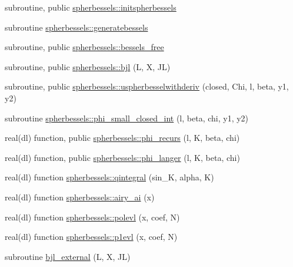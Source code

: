 \begin{DoxyCompactItemize}
\item 
subroutine, public \mbox{\hyperlink{namespacespherbessels_ab479fd257b8fa714e8a3522ab65e11af}{spherbessels\+::initspherbessels}}
\item 
subroutine \mbox{\hyperlink{namespacespherbessels_a94dad04f4df289878f0e038437916427}{spherbessels\+::generatebessels}}
\item 
subroutine, public \mbox{\hyperlink{namespacespherbessels_a0abb3ebb234b8547151b14c0cdb439be}{spherbessels\+::bessels\+\_\+free}}
\item 
subroutine, public \mbox{\hyperlink{namespacespherbessels_a1619c25c91b245252b30a3da4d640050}{spherbessels\+::bjl}} (L, X, JL)
\item 
subroutine, public \mbox{\hyperlink{namespacespherbessels_a19f6db59afef649058999b63f9ab8f65}{spherbessels\+::uspherbesselwithderiv}} (closed, Chi, l, beta, y1, y2)
\item 
subroutine \mbox{\hyperlink{namespacespherbessels_a0d5dede9bff52decb1e7fb2d2df35d3a}{spherbessels\+::phi\+\_\+small\+\_\+closed\+\_\+int}} (l, beta, chi, y1, y2)
\item 
real(dl) function, public \mbox{\hyperlink{namespacespherbessels_ac2bed68bb6862f56c27d5a5cfc5fd94d}{spherbessels\+::phi\+\_\+recurs}} (l, K, beta, chi)
\item 
real(dl) function, public \mbox{\hyperlink{namespacespherbessels_ac93cf86caa7e4d63b164799492196aba}{spherbessels\+::phi\+\_\+langer}} (l, K, beta, chi)
\item 
real(dl) function \mbox{\hyperlink{namespacespherbessels_ae89051535f9e9606be1ab046f5a77854}{spherbessels\+::qintegral}} (sin\+\_\+K, alpha, K)
\item 
real(dl) function \mbox{\hyperlink{namespacespherbessels_a4a053c46f90faa3400f9619fc31cbd1d}{spherbessels\+::airy\+\_\+ai}} (x)
\item 
real(dl) function \mbox{\hyperlink{namespacespherbessels_afef9b0d68efd18edac5580591a39f7ba}{spherbessels\+::polevl}} (x, coef, N)
\item 
real(dl) function \mbox{\hyperlink{namespacespherbessels_a193e3d6761bf168624e2532123ccec2b}{spherbessels\+::p1evl}} (x, coef, N)
\item 
subroutine \mbox{\hyperlink{bessels_8f90_ac428f01b558b9ca2410cf327ca24ee7f}{bjl\+\_\+external}} (L, X, JL)
\end{DoxyCompactItemize}
